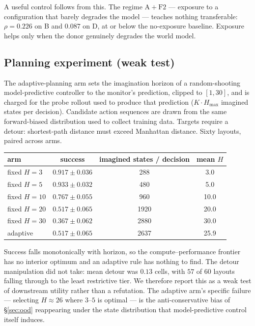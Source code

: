 A useful control follows from this. The regime $\mathrm{A{+}F2}$ --- exposure to a
configuration that barely degrades the model --- teaches nothing transferable: $\rho = 0.226$
on B and $0.087$ on D, at or below the no-exposure baseline. Exposure helps only when the donor
genuinely degrades the world model.

\subsection{Planning experiment (weak test)}

The adaptive-planning arm sets the imagination horizon of a random-shooting model-predictive
controller to the monitor's prediction, clipped to $[1, 30]$, and is charged for the probe
rollout used to produce that prediction ($K \cdot H_{\max}$ imagined states per decision).
Candidate action sequences are drawn from the same forward-biased distribution used to collect
training data. Targets require a detour: shortest-path distance must exceed Manhattan distance.
Sixty layouts, paired across arms.

\begin{center}\small
\begin{tabular}{lccc}
\toprule
arm & success & imagined states / decision & mean $H$ \\
\midrule
fixed $H{=}3$  & $0.917 \pm 0.036$ & \phantom{0}288 & \phantom{0}3.0 \\
fixed $H{=}5$  & $0.933 \pm 0.032$ & \phantom{0}480 & \phantom{0}5.0 \\
fixed $H{=}10$ & $0.767 \pm 0.055$ & \phantom{0}960 & 10.0 \\
fixed $H{=}20$ & $0.517 \pm 0.065$ & 1920 & 20.0 \\
fixed $H{=}30$ & $0.367 \pm 0.062$ & 2880 & 30.0 \\
adaptive       & $0.517 \pm 0.065$ & 2637 & 25.9 \\
\bottomrule
\end{tabular}
\end{center}

Success falls monotonically with horizon, so the compute--performance frontier has no interior
optimum and an adaptive rule has nothing to find. The detour manipulation did not take: mean
detour was $0.13$ cells, with $57$ of $60$ layouts falling through to the least restrictive
tier. We therefore report this as a weak test of downstream utility rather than a refutation.
The adaptive arm's specific failure --- selecting $H \approx 26$ where $3$--$5$ is optimal ---
is the anti-conservative bias of \S\ref{sec:ood} reappearing under the state distribution that
model-predictive control itself induces.

